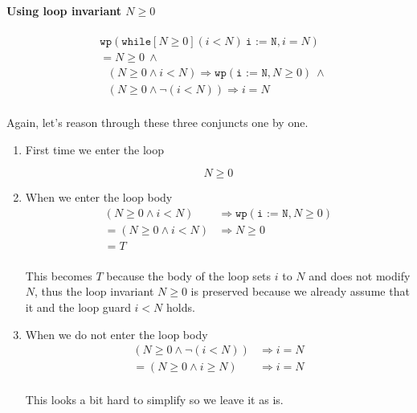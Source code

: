 \documentclass[oneside,11pt,dvipsnames]{book}
\renewcommand{\implies}{\Rightarrow}
\newcommand{\code}[1]{\texttt{#1}}
\begin{document}
\paragraph{Using loop invariant $N \ge 0$}

\begin{equation*}
    \begin{split}
        &\code{wp}(\code{while}[N \ge 0] (i < N ) ~\code{i := N}, i = N)\\
    &= N \ge 0 ~\land  \\
    &~~~ (N \ge 0 \land  i < N) \implies \code{wp}(\code{i := N}, N \ge 0) ~\land \\
    &~~~ (N \ge 0 \land \neg(i < N))  \implies i = N\\ 
    \end{split}
\end{equation*}

Again, let's reason through these three conjuncts one by one.

\begin{enumerate}
    \item First time we enter the loop

        \[N \ge 0\]

    \item When we enter the loop body
    \begin{equation*}
        \begin{split}
            (N \ge 0 \land  i < N) &\implies \code{wp}(\code{i := N}, N \ge 0)\\
            = (N \ge 0 \land  i < N) &\implies  N \ge 0\\
            = T&\\
        \end{split}
    \end{equation*}

    This becomes $T$ because the body of the loop sets $i$ to $N$ and does not modify $N$, thus the loop invariant $N \ge 0$ is preserved because we already assume that it and the loop guard $i < N$ holds.

    \item  When we do not enter the loop body
    \begin{equation*}
        \begin{split}
            (N \ge 0 \land \neg(i < N)) &\implies i = N\\
            = (N \ge 0  \land i \ge N)  &\implies i = N\\
        \end{split}
    \end{equation*}

    This looks a bit hard to simplify so we leave it as is.

\end{enumerate}
\end{document}
